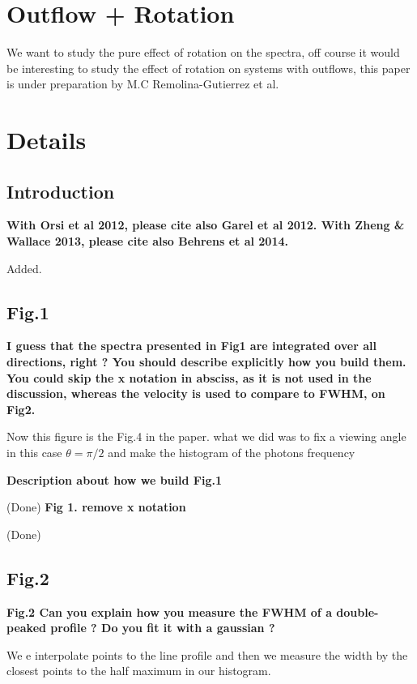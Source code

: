 \documentclass[12pt]{article}
\begin{document}
\section*{Outflow + Rotation}

We want to study the pure effect of rotation on the spectra, off course it would
be interesting to study the effect of rotation on systems with
outflows, this paper is under preparation by M.C Remolina-Gutierrez et
al.   

\section*{Details}

\subsection*{Introduction}

{\bf With Orsi et al 2012, please cite also Garel et al 2012. With Zheng \& Wallace 2013, please cite also Behrens et al 2014.}

Added.

\subsection*{Fig.1}

{\bf I guess that the spectra presented in Fig1 are integrated over all directions, right ? You should describe explicitly how you build them. You could skip the x notation in absciss, as it is not used in the discussion, whereas the velocity is used to compare to FWHM, on Fig2.}

Now this figure is the Fig.4 in the paper. what we did was to fix a viewing angle in this case $\theta= \pi/2$ and make the histogram of the photons frequency



{\bf Description about how we build Fig.1}

 (Done)
{\bf Fig 1. remove x notation} 

(Done)

\subsection*{Fig.2}

{\bf Fig.2 Can you explain how you measure the FWHM of a double-peaked profile ? Do you fit it with a gaussian ?}


We e interpolate points to the line profile and then  we measure the
width by  the closest points to the half maximum in our histogram. 
\end{document}
